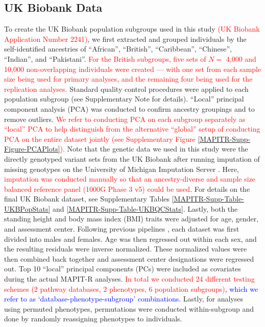 \documentclass[10pt]{article}
\begin{document}
\subsection*{UK Biobank Data} 

To create the UK Biobank population subgroups used in this study \textcolor{red}{(UK Biobank Application Number 2241)}, we first extracted and grouped individuals by the self-identified ancestries of ``African'', ``British'', ``Caribbean'', ``Chinese'', ``Indian'', and ``Pakistani''. \textcolor{red}{For the British subgroups, five sets of $N =$ 4,000 and 10,000 non-overlapping individuals were created --- with one set from each sample size being used for primary analyses, and the remaining four being used for the replication analyses.} Standard quality control procedures were applied to each population subgroup (see Supplementary Note for details). ``Local'' principal component analysis (PCA) was conducted to confirm ancestry groupings and to remove outliers. \textcolor{red}{We refer to conducting PCA on each subgroup separately as ``local'' PCA to help distinguish from the alternative ``global'' setup of conducting PCA on the entire dataset jointly (see Supplementary Figure \ref{MAPITR-Supp-Figure-PCAPlots}).} Note that the genetic data we used in this study were the directly genotyped variant sets from the UK Biobank after running imputation of missing genotypes on the University of Michigan Imputation Server \cite{Das2016}. Here, \textcolor{red}{imputation was conducted manually so that an ancestry-diverse and sample size balanced reference panel (1000G Phase 3 v5) could be used}. For details on the final UK Biobank dataset, see Supplementary Tables \ref{MAPITR-Supp-Table-UKBPopStats} and \ref{MAPITR-Supp-Table-UKBQCStats}. Lastly, both the standing height and body mass index (BMI) traits were adjusted for age, gender, and assessment center. Following previous pipelines \cite{Wood2014a,Locke2015}, each dataset was first divided into males and females. Age was then regressed out within each sex, and the resulting residuals were inverse normalized. These normalized values were then combined back together and assessment center designations were regressed out. Top 10 ``local'' principal components (PCs) were included as covariates during the actual MAPIT-R analyses. \textcolor{red}{In total we conducted 24 different testing schemes (2 pathway databases, 2 phenotypes, 6 population subgroups)}\textcolor{blue}{, which we refer to as `database-phenotype-subgroup' combinations.} Lastly, for analyses using permuted phenotypes, permutations were conducted within-subgroup and done by randomly reassigning phenotypes to individuals.
\end{document}

